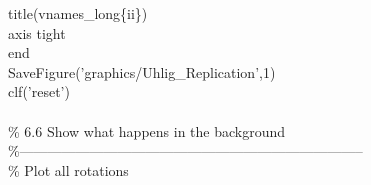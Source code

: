 \hspace{1mm}\hspace{5mm} \hspace{5mm} \hspace{5mm} \hspace{5mm} title(vnames\_long\{ii\}) \\ 
\hspace{1mm}\hspace{5mm} \hspace{5mm} \hspace{5mm} \hspace{5mm} axis tight \\ 
\hspace{1mm}\hspace{5mm} \hspace{5mm} \hspace{5mm} \textcolor{matlabblue}{end} \\ 
\hspace{1mm}\hspace{5mm} \hspace{5mm} \hspace{5mm} SaveFigure(\textcolor{matlabpurple}{'graphics/Uhlig\_Replication'},1) \\ 
\hspace{1mm}\hspace{5mm} \hspace{5mm} \hspace{5mm} clf(\textcolor{matlabpurple}{'reset'}) \\ 
\hspace{1mm}\hspace{5mm} \hspace{5mm} \hspace{5mm}  \\ 
\hspace{1mm}\hspace{5mm} \hspace{5mm} \hspace{5mm} \textcolor{matlabgreen}{\% 6.6 Show what happens in the background }\\ 
\hspace{1mm}\hspace{5mm} \hspace{5mm} \hspace{5mm} \textcolor{matlabgreen}{\%--------------------------------------------------------------------------  }\\ 
\hspace{1mm}\hspace{5mm} \hspace{5mm} \hspace{5mm} \textcolor{matlabgreen}{\% Plot all rotations }\\ 
